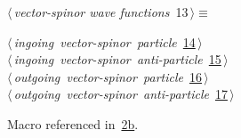 \documentclass[a4paper,12pt]{amsart}
\renewcommand{\NWtarget}[2]{\hypertarget{#1}{#2}}
\renewcommand{\NWlink}[2]{\hyperlink{#1}{#2}}
\renewcommand{\NWtxtMacroRefIn}{Macro referenced in}
\renewcommand{\NWsep}{${\diamond}$}
\begin{document}
\begin{flushleft} \small
\begin{minipage}{\linewidth}\label{scrap32}\raggedright\small
\NWtarget{nuweb13}{} $\langle\,${\itshape vector-spinor wave functions}\nobreak\ {\footnotesize {13}}$\,\rangle\equiv$
\vspace{-1ex}
\begin{list}{}{} \item
\mbox{}\verb@@\hbox{$\langle\,${\itshape ingoing vector-spinor particle}\nobreak\ {\footnotesize \NWlink{nuweb14}{14}}$\,\rangle$}\verb@@\\
\mbox{}\verb@@\hbox{$\langle\,${\itshape ingoing vector-spinor anti-particle}\nobreak\ {\footnotesize \NWlink{nuweb15}{15}}$\,\rangle$}\verb@@\\
\mbox{}\verb@@\hbox{$\langle\,${\itshape outgoing vector-spinor particle}\nobreak\ {\footnotesize \NWlink{nuweb16}{16}}$\,\rangle$}\verb@@\\
\mbox{}\verb@@\hbox{$\langle\,${\itshape outgoing vector-spinor anti-particle}\nobreak\ {\footnotesize \NWlink{nuweb17}{17}}$\,\rangle$}\verb@@{\NWsep}
\end{list}
\vspace{-1.5ex}
\footnotesize
\begin{list}{}{\setlength{\itemsep}{-\parsep}\setlength{\itemindent}{-\leftmargin}}
\item \NWtxtMacroRefIn\ \NWlink{nuweb2b}{2b}.

\item{}
\end{list}
\end{minipage}\vspace{4ex}
\end{flushleft}
\end{document}
